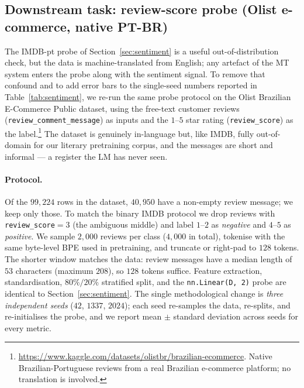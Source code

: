\documentclass[11pt]{article}
\begin{document}
\subsection{Downstream task: review-score probe (Olist e-commerce, native PT-BR)}\label{sec:olist}

The IMDB-pt probe of Section~\ref{sec:sentiment} is a useful
out-of-distribution check, but the data is machine-translated from
English; any artefact of the MT system enters the probe along with the
sentiment signal. To remove that confound and to add error bars to the
single-seed numbers reported in Table~\ref{tab:sentiment}, we re-run
the same probe protocol on the Olist Brazilian E-Commerce Public
dataset, using the free-text customer reviews
(\texttt{review\_comment\_message}) as inputs and the $1$--$5$ star
rating (\texttt{review\_score}) as the label.\footnote{%
\url{https://www.kaggle.com/datasets/olistbr/brazilian-ecommerce}.
Native Brazilian-Portuguese reviews from a real Brazilian e-commerce
platform; no translation is involved.} The dataset is genuinely
in-language but, like IMDB, fully out-of-domain for our literary
pretraining corpus, and the messages are short and informal --- a
register the LM has never seen.

\paragraph{Protocol.}
Of the $99{,}224$ rows in the dataset, $40{,}950$ have a non-empty
review message; we keep only those. To match the binary IMDB protocol
we drop reviews with \texttt{review\_score}$=3$ (the ambiguous middle)
and label $1$--$2$ as \emph{negative} and $4$--$5$ as \emph{positive}.
We sample $2{,}000$ reviews per class ($4{,}000$ in total),
tokenise with the same byte-level BPE used in pretraining, and
truncate or right-pad to $128$ tokens. The shorter window matches
the data: review messages have a median length of $53$ characters
(maximum $208$), so $128$ tokens suffice. Feature extraction,
standardisation, $80\%/20\%$ stratified split, and the
\texttt{nn.Linear(D, 2)} probe are identical to
Section~\ref{sec:sentiment}. The single methodological change is
\emph{three independent seeds} ($42$, $1337$, $2024$); each seed
re-samples the data, re-splits, and re-initialises the probe, and we
report mean $\pm$ standard deviation across seeds for every metric.
\end{document}
